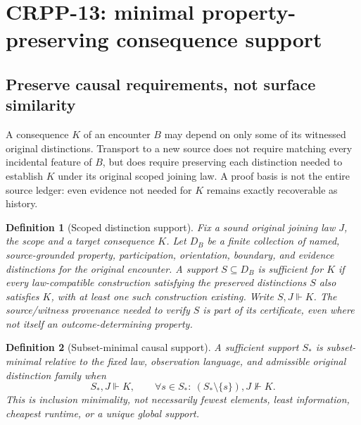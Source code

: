 \documentclass[11pt]{article}
\newtheorem{definition}{Definition}[section]
\begin{document}
\section{CRPP-13: minimal property-preserving consequence support}
\label{sec:crpp13}

\subsection{Preserve causal requirements, not surface similarity}
A consequence $K$ of an encounter $B$ may depend on only some
of its witnessed original distinctions. Transport to a new
source does not require matching every incidental feature
of $B$, but does require preserving each distinction needed
to establish $K$ under its original scoped joining law.
A proof basis is not the entire source ledger: even evidence
not needed for $K$ remains exactly recoverable as history.

\begin{definition}[Scoped distinction support]
Fix a sound original joining law $J$, the scope and
a target consequence $K$. Let $D_B$ be a finite collection
of named, source-grounded property, participation, orientation,
boundary, and evidence distinctions for the original
encounter. A support $S\subseteq D_B$ is \emph{sufficient}
for $K$ if every law-compatible construction satisfying
the preserved distinctions $S$ also satisfies $K$,
with at least one such construction existing. Write
$S,J\Vdash K$. The source/witness provenance needed to
verify $S$ is part of its certificate, even where not
itself an outcome-determining property.
\end{definition}

\begin{definition}[Subset-minimal causal support]
A sufficient support $S_*$ is subset-minimal relative
to the fixed law, observation language, and admissible
original distinction family when
\[
 S_*,J\Vdash K,\qquad
 \forall s\in S_*:\ (S_*\setminus\{s\}),J\not\Vdash K.
\]
This is inclusion minimality, not necessarily fewest
elements, least information, cheapest runtime, or a
unique global support.
\end{definition}
\end{document}
